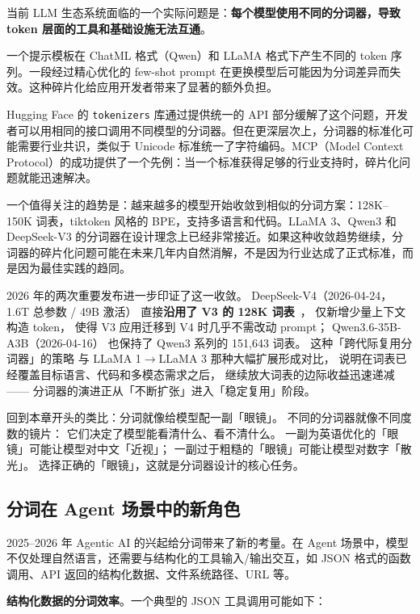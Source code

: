 当前 LLM 生态系统面临的一个实际问题是：\textbf{每个模型使用不同的分词器，导致 token 层面的工具和基础设施无法互通}。

一个提示模板在 ChatML 格式（Qwen）和 LLaMA 格式下产生不同的 token 序列。一段经过精心优化的 few-shot prompt 在更换模型后可能因为分词差异而失效。这种碎片化给应用开发者带来了显著的额外负担。

Hugging Face 的 \texttt{tokenizers} 库通过提供统一的 API 部分缓解了这个问题，开发者可以用相同的接口调用不同模型的分词器。但在更深层次上，分词器的标准化可能需要行业共识，类似于 Unicode 标准统一了字符编码。MCP（Model Context Protocol）的成功提供了一个先例：当一个标准获得足够的行业支持时，碎片化问题就能迅速解决。

一个值得关注的趋势是：越来越多的模型开始收敛到相似的分词方案：128K--150K 词表，tiktoken 风格的 BPE，支持多语言和代码。LLaMA 3、Qwen3 和 DeepSeek-V3 的分词器在设计理念上已经非常接近。如果这种收敛趋势继续，分词器的碎片化问题可能在未来几年内自然消解，不是因为行业达成了正式标准，而是因为最佳实践的趋同。

2026 年的两次重要发布进一步印证了这一收敛。
DeepSeek-V4（2026-04-24，1.6T 总参数 / 49B 激活）
直接\textbf{沿用了 V3 的 128K 词表}~\cite{deepseekv4}，
仅新增少量上下文构造 token，
使得 V3 应用迁移到 V4 时几乎不需改动 prompt；
Qwen3.6-35B-A3B（2026-04-16）
也保持了 Qwen3 系列的 151,643 词表。
这种「跨代际复用分词器」的策略
与 LLaMA 1$\to$LLaMA 3 那种大幅扩展形成对比，
说明在词表已经覆盖目标语言、代码和多模态需求之后，
继续放大词表的边际收益迅速递减——
分词器的演进正从「不断扩张」进入「稳定复用」阶段。

回到本章开头的类比：分词就像给模型配一副「眼镜」。
不同的分词器就像不同度数的镜片：
它们决定了模型能看清什么、看不清什么。
一副为英语优化的「眼镜」可能让模型对中文「近视」；
一副过于粗糙的「眼镜」可能让模型对数字「散光」。
选择正确的「眼镜」，这就是分词器设计的核心任务。

\subsection{分词在 Agent 场景中的新角色}

2025--2026 年 Agentic AI 的兴起给分词带来了新的考量。在 Agent 场景中，模型不仅处理自然语言，还需要与结构化的工具输入/输出交互，如 JSON 格式的函数调用、API 返回的结构化数据、文件系统路径、URL 等。

\textbf{结构化数据的分词效率}。一个典型的 JSON 工具调用可能如下：

